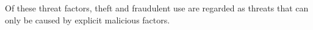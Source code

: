 


Of these threat factors, theft and fraudulent use are regarded as
threats that can only be caused by explicit malicious factors.


